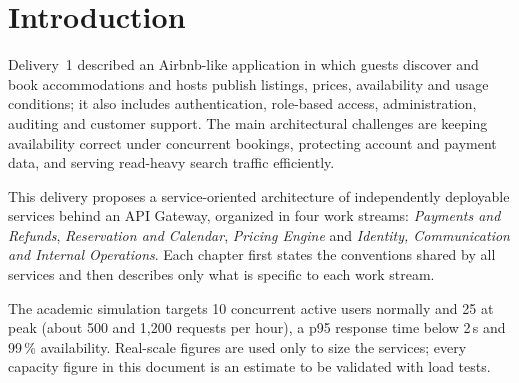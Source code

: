 \section{Introduction}

Delivery~1 described an Airbnb-like application in which guests discover and
book accommodations and hosts publish listings, prices, availability and usage
conditions; it also includes authentication, role-based access, administration,
auditing and customer support. The main architectural challenges are keeping
availability correct under concurrent bookings, protecting account and payment
data, and serving read-heavy search traffic efficiently.

This delivery proposes a service-oriented architecture of independently
deployable services behind an API Gateway, organized in four work streams:
\emph{Payments and Refunds}, \emph{Reservation and Calendar}, \emph{Pricing
Engine} and \emph{Identity, Communication and Internal Operations}. Each
chapter first states the conventions shared by all services and then describes
only what is specific to each work stream.

The academic simulation targets 10 concurrent active users normally and 25 at
peak (about 500 and 1,200 requests per hour), a p95 response time below
2\,s and 99\,\% availability. Real-scale figures are used only to size the
services; every capacity figure in this document is an estimate to be validated
with load tests.
